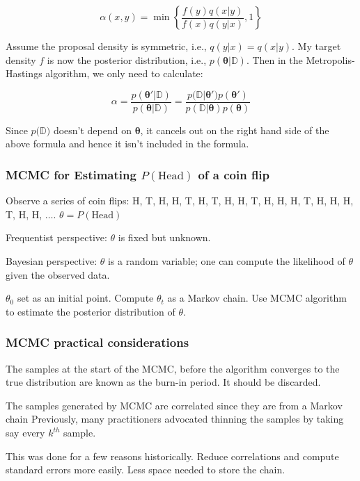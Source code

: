 \[
\alpha(x,y) = \min\left\{\frac{f(y)q(x|y)}{f(x)q(y|x)},1\right\}
\]

Assume the proposal density is symmetric, i.e.,  $q(y|x) = q(x|y)$. My target density $f$ is now the posterior distribution, i.e., $p(\boldsymbol{\theta}|\mathbb{D})$. Then in the Metropolis-Hastings algorithm, we only need to calculate:

\[
\alpha = \frac{p(\boldsymbol{\theta'|\mathbb{D}})}{p(\boldsymbol{\theta}|\mathbb{D})}=\frac{p(\mathbb{D}|\boldsymbol{\theta')}p(\boldsymbol{\theta'})}{p(\mathbb{D}|\boldsymbol{\theta})p(\boldsymbol{\theta})}
\]

Since $p(\mathbb{D)}$ doesn’t depend on $\boldsymbol{\theta}$, it cancels out on the right hand side of the above formula and hence it isn’t included in the formula.

\subsubsection{MCMC for Estimating $P(\text{Head})$ of a coin flip}

\indent 

Observe a series of coin flips: H, T, H, H, T, H, T, H, H, T, H, H, H, T, H, H, H, T, H, H, $\ldots$. $\theta = P(\text{Head})$

Frequentist perspective: $\theta$ is fixed but unknown.

Bayesian perspective: $\theta$ is a random variable; one can compute the likelihood of $\theta$ given the observed data.

$\theta_0$ set as an initial point. Compute $\theta_t$ as a Markov chain. Use MCMC algorithm to estimate the posterior distribution of $\theta$.

\subsubsection{MCMC practical considerations}

\indent 

The samples at the start of the MCMC, before the algorithm converges to the true distribution are known as the burn-in period. It should be discarded.

The samples generated by MCMC are correlated since they are from a Markov chain
Previously, many practitioners advocated thinning the samples by taking say every $k^{th}$ sample. 

This was done for a few reasons historically. Reduce correlations and compute standard errors more easily. Less space needed to store the chain.

